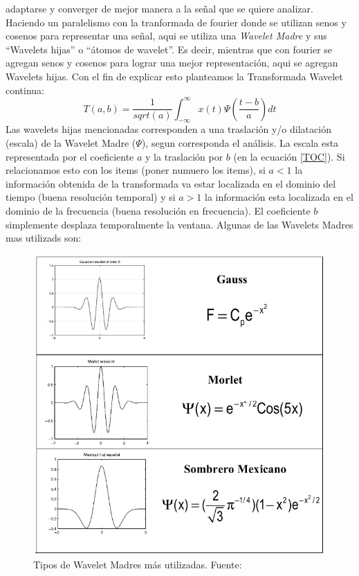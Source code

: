 \documentclass{article}
\begin{document}
adaptarse y converger de mejor manera a la señal que se quiere analizar. Haciendo un paralelismo con la tranformada de fourier donde se utilizan senos y cosenos para representar una señal, aqui se utiliza una \textit{Wavelet Madre} y sus ``Wavelets hijas'' o ``átomos de wavelet''. Es decir, mientras que con fourier se agregan senos y cosenos para lograr 
una mejor representación, aqui se agregan Wavelets hijas. Con el fin de explicar esto planteamos la Transformada Wavelet continua:
\begin{equation}
    \label{TOC}
    T(a,b)= \frac{1}{sqrt(a)} \int_{-\infty}^{\infty} x(t) \Psi(\frac{t-b}{a}) dt
\end{equation}
Las wavelets hijas mencionadas corresponden a una traslación y/o dilatación (escala) de la Wavelet Madre ($\Psi$), segun corresponda el análisis. La escala esta representada por el coeficiente $a$ y la traslación por $b$ (en la ecuación \ref{TOC}). Si relacionamos esto con los items (poner numuero los items), si $a<1$ la información obtenida de la transformada va estar localizada en el dominio del tiempo (buena resolución temporal) y si 
$a>1$ la información esta localizada en el dominio de la frecuencia (buena resolución en frecuencia). El coeficiente $b$ simplemente desplaza temporalmente la ventana. Algunas de las Wavelets Madres mas utilizads son:
\begin{figure}[H]
    \centering
    \includegraphics[scale=0.5]{Fig/7}
    \caption{Tipos de Wavelet Madres más utilizadas. Fuente:}
    \label{WM}
\end{figure}
\end{document}
